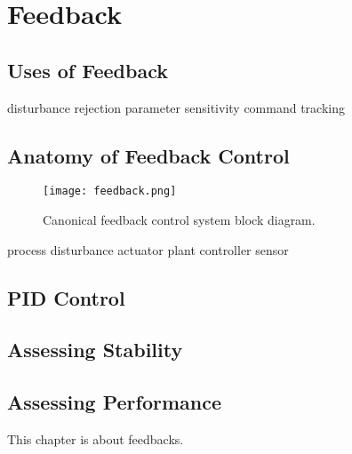 \chapter{Feedback}\label{c:feedback}
\section{Uses of Feedback}

disturbance rejection
parameter sensitivity
command tracking
\section{Anatomy of Feedback Control}

\begin{figure}[hbt]
\centering
\texttt{[image: feedback.png]}
\caption{Canonical feedback control system block diagram.}
\label{f:fdbk}
\end{figure}

process
disturbance
actuator
plant 
controller
sensor


\section{PID Control}

\section{Assessing Stability}

\section{Assessing Performance}

This chapter is about \gls{feedback}s.
